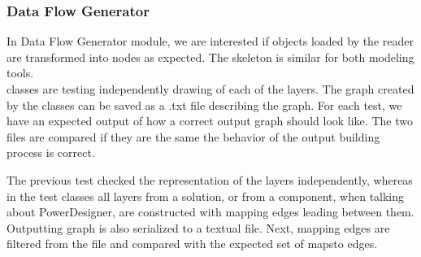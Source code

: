 \subsubsection{Data Flow Generator}

In Data Flow Generator module, we are interested if objects loaded by the reader are transformed into nodes as expected.
The skeleton is similar for both modeling tools. \\

 classes are testing independently drawing of each of the layers. The graph created by the  classes can be saved as a .txt file describing the graph. 
For each test, we have an expected output of how a correct output graph should look like. The two files are compared if they are the same the behavior of the output building process is correct.

The previous test checked the representation of the layers independently, whereas in the test classes  all layers from a solution, or from a component, when talking about PowerDesigner, are constructed with mapping edges leading between them. Outputting graph is also serialized to a textual file. Next, mapping edges are filtered from the file and compared with the expected set of maps\textunderscore to edges. 